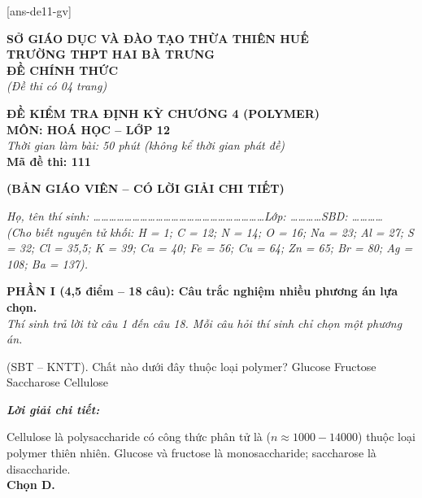 \documentclass[11pt,a4paper]{article}
\def\loigiai#1{
\par\begingroup\color{blue!80!black}\small
\noindent\textbf{\textit{Lời giải chi tiết:}}\par
#1\par\endgroup}
\begin{document}
[ans-de11-gv]

\noindent
\begin{minipage}[t]{0.48\textwidth}
	\centering
	\textbf{SỞ GIÁO DỤC VÀ ĐÀO TẠO THỪA THIÊN HUẾ}\\
	\textbf{TRƯỜNG THPT HAI BÀ TRƯNG}\\
	\textbf{ĐỀ CHÍNH THỨC}\\
	\textit{(Đề thi có 04 trang)}
\end{minipage}\hfill
\begin{minipage}[t]{0.48\textwidth}
	\centering
	\textbf{\color{mainGreen}ĐỀ KIỂM TRA ĐỊNH KỲ CHƯƠNG 4 (POLYMER)}\\
	\textbf{MÔN: HOÁ HỌC -- LỚP 12}\\
	\textit{Thời gian làm bài: 50 phút (không kể thời gian phát đề)}\\
	\textbf{Mã đề thi: 111}
\end{minipage}


\vspace{0.1cm}
\begin{center}
	\textbf{\color{hfRed}\Large (BẢN GIÁO VIÊN -- CÓ LỜI GIẢI CHI TIẾT)}
\end{center}

\vspace{0.1cm}
\noindent\textit{Họ, tên thí sinh: \dots\dots\dots\dots\dots\dots\dots\dots\dots\dots\dots\dots\dots\dots\dots\dots\dots\dots\dots\dots\dots\dots Lớp: \dots\dots\dots\dots SBD: \dots\dots\dots\dots}\\
\noindent\textit{(Cho biết nguyên tử khối: H = 1; C = 12; N = 14; O = 16; Na = 23; Al = 27; S = 32; Cl = 35,5; K = 39; Ca = 40; Fe = 56; Cu = 64; Zn = 65; Br = 80; Ag = 108; Ba = 137).}

\vspace{0.15cm}
\noindent
\textbf{PHẦN I (4,5 điểm -- 18 câu): Câu trắc nghiệm nhiều phương án lựa chọn.}\\
\textit{Thí sinh trả lời từ câu 1 đến câu 18. Mỗi câu hỏi thí sinh chỉ chọn một phương án.}

\setcounter{ex}{0}

\begin{ex}
(SBT -- KNTT). Chất nào dưới đây thuộc loại polymer?
\choice
{Glucose}
{Fructose}
{Saccharose}
{\True Cellulose}
\loigiai{
Cellulose là polysaccharide có công thức phân tử là \ce{(C6H10O5)_n} ($n \approx 1000 - 14000$) thuộc loại polymer thiên nhiên. Glucose và fructose là monosaccharide; saccharose là disaccharide.\\
\textbf{Chọn D.}}
\end{ex}
\end{document}
